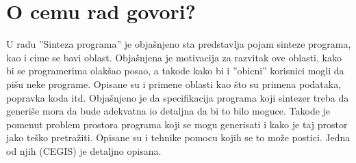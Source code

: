 \documentclass[a4paper]{report}
\begin{document}
\section{O cemu rad govori?}
U radu ''Sinteza programa'' je objašnjeno sta predstavlja pojam sinteze programa, kao i cime se bavi oblast. Objašnjena je motivacija za razvitak ove oblasti, kako bi se programerima olakšao posao, a takode kako bi i ''obicni'' korisnici mogli da pišu neke programe. Opisane su i primene oblasti kao što su primena podataka, popravka koda itd. Objašnjeno je da specifikacija programa koji sintezer treba da generiše mora da bude adekvatna io detaljna da bi to bilo moguce. Takode je pomenut problem prostora programa koji se mogu generisati i kako je taj prostor jako teško pretražiti. Opisane su i tehnike pomocu kojih se to može postici. Jedna od njih (CEGIS) je detaljno opisana.
\end{document}
